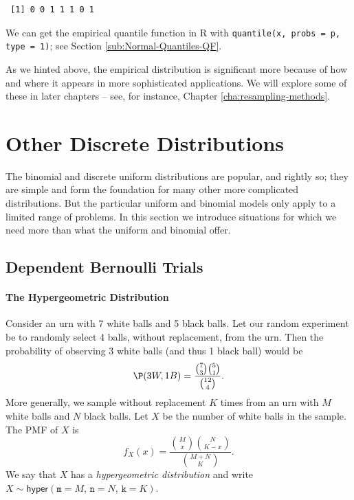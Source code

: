 \documentclass[captions=tableheading]{scrbook}
\begin{document}
\begin{verbatim}
 [1] 0 0 1 1 1 0 1
\end{verbatim}

We can get the empirical quantile function in \textsf{R} with \texttt{quantile(x, probs = p, type = 1)}; see Section \ref{sub:Normal-Quantiles-QF}.

As we hinted above, the empirical distribution is significant more because of how and where it appears in more sophisticated applications. We will explore some of these in later chapters -- see, for instance, Chapter \ref{cha:resampling-methods}.
\section{Other Discrete Distributions}
\label{sec-5-6}

\label{sec:other-discrete-distributions}

The binomial and discrete uniform distributions are popular, and rightly so; they are simple and form the foundation for many other more complicated distributions. But the particular uniform and binomial models only apply to a limited range of problems. In this section we introduce situations for which we need more than what the uniform and binomial offer.
\subsection{Dependent Bernoulli Trials}
\label{sec-5-6-1}

\label{sec:non-bernoulli-trials}

\paragraph*{The Hypergeometric Distribution}
\label{sub:hypergeometric-dist}

Consider an urn with 7 white balls and 5 black balls. Let our random experiment be to randomly select 4 balls, without replacement, from the urn. Then the probability of observing 3 white balls (and thus 1 black ball) would be
\begin{equation}
\P(3W,1B)=\frac{{7 \choose 3}{5 \choose 1}}{{12 \choose 4}}.
\end{equation}
More generally, we sample without replacement \(K\) times from an urn with \(M\) white balls and \(N\) black balls. Let \(X\) be the number of white balls in the sample. The PMF of \(X\) is
\begin{equation}
f_{X}(x)=\frac{{M \choose x}{N \choose K-x}}{{M+N \choose K}}.
\end{equation}
We say that \(X\) has a \emph{hypergeometric distribution} and write \(X\sim\mathsf{hyper}(\mathtt{m}=M,\,\mathtt{n}=N,\,\mathtt{k}=K)\).
\end{document}
